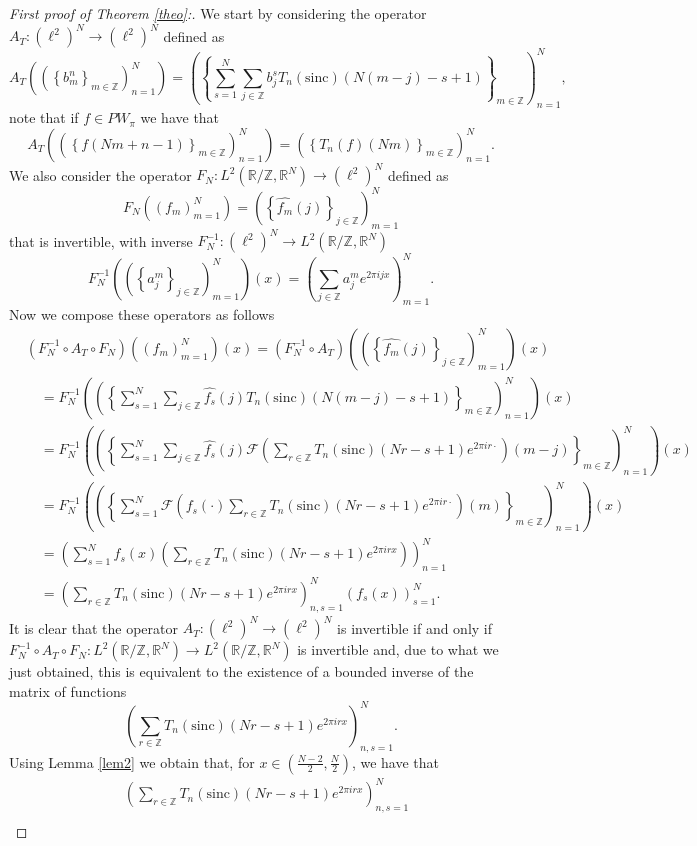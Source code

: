\documentclass[reqno]{amsart}
\theoremstyle{plain}
\theoremstyle{definition}
\numberwithin{equation}{section}
\newcommand{\Z}{{\mathbb Z}}
\newcommand{\R}{{\mathbb R}}
\newcommand{\pa}[1]{\left(#1\right)}
\newcommand{\sinc}{\mathrm{sinc}}
\begin{document}
\begin{proof}[First proof of Theorem \ref{theo}:]
    We start by considering the operator $A_T: \pa{\ell^2}^N \to \pa{\ell^2}^N$ defined as
    $$A_T\pa{\pa{\left\{ b^n_m \right\}_{m\in\Z}}_{n=1}^N}
	=\pa{\left\{ \sum_{s=1}^N\sum_{j\in\Z} b_j^s T_n\pa{\sinc}(N(m-j)-s+1)\right\}_{m\in\Z}}_{n=1}^N,$$
	note that if $f\in PW_\pi$ we have that
	$$A_T\pa{\pa{\left\{ f(Nm+n-1) \right\}_{m\in\Z}}_{n=1}^N}
	=\pa{\left\{ T_n(f)(Nm)\right\}_{m\in\Z}}_{n=1}^N.$$
	We also consider the operator $F_N:L^2\pa{\R / \Z,\R^N}\to \pa{\ell^2}^N$ defined as
	$$F_N\pa{\pa{f_m}_{m=1}^N}=\pa{\left\{\widehat{f_m}(j)\right\}_{j\in\Z}}_{m=1}^N$$
	that is invertible, with inverse $F_N^{-1}:\pa{\ell^2}^N \to L^2\pa{\R / \Z,\R^N}$
	$$F_N^{-1}\pa{\pa{\left\{a^m_j\right\}_{j\in\Z}}_{m=1}^N}(x)=\pa{\sum_{j\in\Z} a^m_j e^{2\pi i j x}}_{m=1}^N.$$
	Now we compose these operators as follows
	\begin{align*}
		&\pa{F_N^{-1} \circ A_T \circ F_N}\pa{\pa{f_m}_{m=1}^N}(x)
		=\pa{F_N^{-1} \circ A_T }\pa{\pa{\left\{\widehat{f_m}(j)\right\}_{j\in\Z}}_{m=1}^N}(x) \\
		& \quad = F_N^{-1}\pa{\pa{\left\{ \sum_{s=1}^N\sum_{j\in\Z} \widehat{f_s}(j) 
		T_n\pa{\sinc}\pa{N(m-j)-s+1}\right\}_{m\in\Z}}_{n=1}^N}(x) \\
		& \quad = F_N^{-1}\pa{\pa{\left\{ \sum_{s=1}^N\sum_{j\in\Z} \widehat{f_s}(j) 
		\mathcal{F}\pa{\sum_{r\in\Z} T_n(\sinc)(Nr-s+1) e^{2\pi i r \cdot}}(m-j)\right\}_{m\in\Z}}_{n=1}^N}(x) \\
		& \quad = F_N^{-1}\pa{\pa{\left\{ \sum_{s=1}^N \mathcal{F}\pa{f_s(\cdot) 
		\sum_{r\in\Z} T_n(\sinc)(Nr-s+1) e^{2\pi i r \cdot}}(m)\right\}_{m\in\Z}}_{n=1}^N}(x) \\
		& \quad = \pa{\sum_{s=1}^N f_s(x) \pa{\sum_{r\in\Z} T_n(\sinc)(Nr-s+1) e^{2\pi i r x}}}_{n=1}^N \\
		& \quad =\pa{\sum_{r\in\Z} T_n(\sinc)(Nr-s+1) e^{2\pi i r x}}_{n,s=1}^N \pa{f_s(x)}_{s=1}^N.
	\end{align*}
	It is clear that the operator $A_T:\pa{\ell^2}^N\to\pa{\ell^2}^N$ is invertible if and only if 
	$F_N^{-1} \circ A_T \circ F_N:L^2\pa{\R / \Z,\R^N}\to L^2\pa{\R / \Z,\R^N}$ is invertible and, due 
	to what we just obtained, this is equivalent to the existence of a bounded inverse of the matrix of functions
	$$\pa{\sum_{r\in\Z} T_n(\sinc)(Nr-s+1) e^{2\pi i r x}}_{n,s=1}^N.$$
	Using Lemma \ref{lem2} we obtain that, for $x\in \pa{\frac{N-2}{2},\frac{N}{2}}$, we have that
	\begin{align*}
		&\pa{\sum_{r\in\Z} T_n(\sinc)(Nr-s+1) e^{2\pi i r x}}_{n,s=1}^N \\

\end{align*}
\end{proof}
\end{document}
